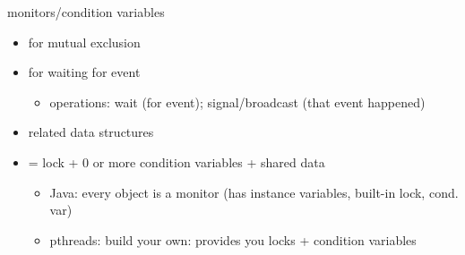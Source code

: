 \usetikzlibrary{arrows.meta,calc,chains,fit,matrix}

\begin{frame}{monitors/condition variables}
\begin{itemize}
\item {} for mutual exclusion
\item {} for waiting for event
    \begin{itemize}
    \item operations: wait (for event); signal/broadcast (that event happened)
    \end{itemize}
\item related data structures
\vspace{.5cm}
\item {} = lock + 0 or more condition variables + shared data
    \begin{itemize}
    \item Java: every object is a monitor (has instance variables, built-in lock, cond. var)
    \item pthreads: build your own: provides you locks + condition variables
    \end{itemize}
\end{itemize}
\end{frame}

